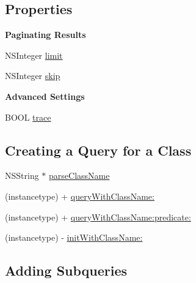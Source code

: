 \subsection*{Properties}
\begin{Indent}{\bf Paginating Results}\par
{\em 

 

 }\begin{DoxyCompactItemize}
\item 
N\+S\+Integer \hyperlink{interface_p_f_query_a78060204fccd16a9ac9718b219778b64}{limit}
\item 
N\+S\+Integer \hyperlink{interface_p_f_query_a2b5deec7ffc434a4c787f5aa0471ddcd}{skip}
\end{DoxyCompactItemize}
\end{Indent}
\begin{Indent}{\bf Advanced Settings}\par
{\em 

 

 }\begin{DoxyCompactItemize}
\item 
B\+O\+O\+L \hyperlink{interface_p_f_query_a86849de3551a7ea56c652f55f48bfe47}{trace}
\end{DoxyCompactItemize}
\end{Indent}
\subsection*{Creating a Query for a Class}
\label{_amgrp0abaa4c5df151d9cd61e9f86689f64f8}%


 

 \begin{DoxyCompactItemize}
\item 
N\+S\+String $\ast$ \hyperlink{interface_p_f_query_afba0f4baaf28a4b871fe5b9d5dc3604c}{parse\+Class\+Name}
\item 
(instancetype) + \hyperlink{interface_p_f_query_aa315561c832578b903a06f88f1419ad7}{query\+With\+Class\+Name\+:}
\item 
(instancetype) + \hyperlink{interface_p_f_query_a11ee28c6ff2990b5514212f471b93826}{query\+With\+Class\+Name\+:predicate\+:}
\item 
(instancetype) -\/ \hyperlink{interface_p_f_query_a7d575cc4519ef920db58be0509ad4198}{init\+With\+Class\+Name\+:}
\end{DoxyCompactItemize}
\subsection*{Adding Subqueries}
\label{_amgrpd8838bc65d73f6749e48d7420d55c261}%


